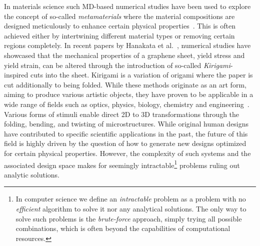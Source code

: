 In materials science such \acrshort{MD}-based numerical studies have been used
to explore the concept of so-called \textit{metamaterials} where the material
compositions are designed meticulously to enhance certain physical
properties~\mbox{\cite{PhysRevLett.121.255304, PhysRevResearch.2.042006,
graphene/hBN, Mao, Yang, Forte}}. This is often achieved either by intertwining
different material types or removing certain regions completely. In recent
papers by Hanakata et al.~\cite{PhysRevLett.121.255304,
PhysRevResearch.2.042006}, numerical studies have showcased that the mechanical
properties of a graphene sheet, yield stress and yield strain, can be altered
through the introduction of so-called \textit{Kirigami}-inspired cuts into the
sheet. Kirigami is a variation of origami where the paper is cut additionally to
being folded. While these methods originate as an art form, aiming to produce
various artistic objects, they have proven to be applicable in a wide range of
fields such as optics, physics, biology, chemistry and
engineering~\cite{chen_kirigamiorigami_2020}. Various forms of stimuli enable
direct 2D to 3D transformations through the folding, bending, and twisting of
microstructures. While original human designs have contributed to specific
scientific applications in the past, the future of this field is highly driven
by the question of how to generate new designs optimized for certain physical
properties. However, the complexity of such systems and the associated design
space makes for seemingly intractable\footnote{In computer science we define an
\textit{intractable} problem as a problem with no \textit{efficient} algorithm
to solve it nor any analytical solutions. The only way to solve such problems is
the \textit{brute-force} approach, simply trying all possible combinations, which
is often beyond the capabilities of computational resources.} problems ruling
out analytic solutions.

